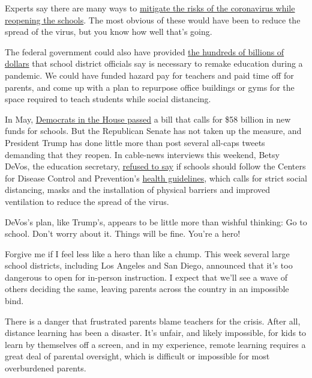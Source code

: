Experts say there are many ways to
\href{https://www.nytimes.com/2020/07/10/opinion/coronavirus-schools-reopening.html}{mitigate
the risks of the coronavirus while reopening the schools}. The most
obvious of these would have been to reduce the spread of the virus, but
you know how well that's going.

The federal government could also have provided
\href{https://ccsso.org/blog/ccsso-submits-cost-estimate-safely-reopening-public-schools-after-covid}{the
hundreds of billions of dollars} that school district officials say is
necessary to remake education during a pandemic. We could have funded
hazard pay for teachers and paid time off for parents, and come up with
a plan to repurpose office buildings or gyms for the space required to
teach students while social distancing.

In May,
\href{https://blogs.edweek.org/edweek/campaign-k-12/2020/05/covid-relief-schools-60-billion-democrats-bill.html}{Democrats
in the House passed} a bill that calls for \$58 billion in new funds for
schools. But the Republican Senate has not taken up the measure, and
President Trump has done little more than post several all-caps tweets
demanding that they reopen. In cable-news interviews this weekend, Betsy
DeVos, the education secretary,
\href{https://www.cnn.com/2020/07/12/politics/betsy-devos-schools-reopening-coronavirus-cnntv/index.html}{refused
to say} if schools should follow the Centers for Disease Control and
Prevention's
\href{https://www.cdc.gov/coronavirus/2019-ncov/community/schools-childcare/schools.html}{health
guidelines}, which calls for strict social distancing, masks and the
installation of physical barriers and improved ventilation to reduce the
spread of the virus.

DeVos's plan, like Trump's, appears to be little more than wishful
thinking: Go to school. Don't worry about it. Things will be fine.
You're a hero!

Forgive me if I feel less like a hero than like a chump. This week
several large school districts, including Los Angeles and San Diego,
announced that it's too dangerous to open for in-person instruction. I
expect that we'll see a wave of others deciding the same, leaving
parents across the country in an impossible bind.

There is a danger that frustrated parents blame teachers for the crisis.
After all, distance learning has been a disaster. It's unfair, and
likely impossible, for kids to learn by themselves off a screen, and in
my experience, remote learning requires a great deal of parental
oversight, which is difficult or impossible for most overburdened
parents.

